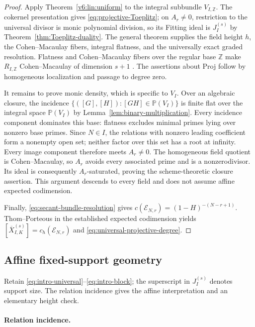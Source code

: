 \documentclass[10pt,fleqn]{article}
\numberwithin{equation}{section}
\newcommand{\PP}{\mathbb P}
\newcommand{\cE}{\mathcal E}
\begin{document}
\begin{proof}
Apply Theorem~\ref{v6:lin:uniform} to the integral subbundle
$V_{I,\mathbb Z}$.  The cokernel presentation gives
\eqref{eq:projective-Toeplitz}; on $A_r\ne0$, restriction to the
universal divisor is monic polynomial division, so its Fitting ideal
is $J_I^{(s)}$ by Theorem~\ref{thm:Toeplitz-duality}.
The general theorem supplies the field height $h$, the
Cohen--Macaulay fibers, integral flatness, and the universally exact
graded resolution.  Flatness and Cohen--Macaulay fibers over the
regular base $\mathbb Z$ make $R_{I,\mathbb Z}$ Cohen--Macaulay
of dimension $s+1$ \cite{EisenbudCA}.  The assertions about Proj follow
by homogeneous localization and passage to degree zero.

It remains to prove monic density, which is specific to $V_I$.
Over an algebraic closure, the incidence
$\{([G],[H]):[GH]\in\PP(V_I)\}$ is finite flat over the integral
space $\PP(V_I)$ by Lemma~\ref{lem:binary-multiplication}.
Every incidence component dominates this base: flatness excludes
minimal primes lying over nonzero base primes.  Since $N\in I$, the
relations with nonzero leading coefficient form a nonempty open set;
neither factor over this set has a root at infinity.  Every image
component therefore meets $A_r\ne0$.  The homogeneous field quotient
is Cohen--Macaulay, so $A_r$ avoids every associated prime and is a
nonzerodivisor.  Its ideal is consequently $A_r$-saturated, proving
the scheme-theoretic closure assertion.  This argument descends to
every field and does not assume affine expected codimension.

Finally, \eqref{eq:secant-bundle-resolution} gives
$c(\cE_{N,r})=(1-H)^{-(N-r+1)}$.
Thom--Porteous in the established expected codimension yields
$[\overline X_{I,K}^{(s)}]=c_h(\cE_{N,r})$
and \eqref{eq:universal-projective-degree}.
\end{proof}

\subsection{Affine fixed-support geometry}\label{sec:fixed}

Retain \eqref{eq:intro-universal}--\eqref{eq:intro-block}; the
superscript in $J_I^{(s)}$ denotes support size.  The relation incidence
gives the affine interpretation and an elementary height check.

\paragraph{Relation incidence.}
\end{document}
